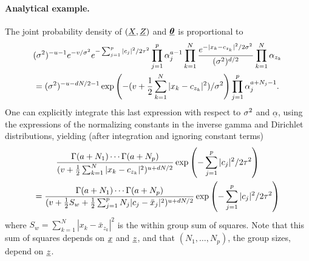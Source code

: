 \paragraph{Analytical example.}
The joint probability density of $({\underline{X}}, {\underline{Z}})$ and $\underline{\bm {\theta}}$ is proportional to
\begin{multline*}
(\sigma^2)^{-u-1} e^{-v/\sigma^2} e^{-\sum_{j=1}^p |c_j|^2/2\tau^2} \prod_{j=1}^p \alpha_j^{a-1}\prod_{k=1}^N \frac{e^{-|x_k - c_{z_k}|^2/2\sigma^2}}{(\sigma^2)^{d/2}} \prod_{k=1}^N \alpha_{z_k} \\
= (\sigma^2)^{-u-dN/2 -1} \exp\left(- (v + \frac12 \sum_{k=1}^N|x_k-c_{z_k}|^2)/\sigma^2\right)\prod_{j=1}^p \alpha_j^{a+N_j-1} . 
\end{multline*}
One can explicitly integrate this last expression with respect to $\sigma^2$ and $\underline\alpha$, using the expressions of the normalizing constants in  the inverse gamma and Dirichlet distributions, yielding (after integration and ignoring constant terms)
\begin{multline*}
\frac{\Gamma(a+N_1) \cdots \Gamma(a+N_p)}{(v + \frac12 \sum_{k=1}^N|x_k-c_{z_k}|^2)^{u+dN/2}} \exp\left(- \sum_{j=1}^p |c_j|^2/2\tau^2\right)\\
= \frac{\Gamma(a+N_1) \cdots \Gamma(a+N_p)}{(v + \frac12 S_w + \frac12 \sum_{j=1}^p N_j |c_{j} - \bar x_j|^2)^{u+dN/2}} \exp\left(- \sum_{j=1}^p |c_j|^2/2\tau^2\right)
\end{multline*}
where $S_w = \sum_{k=1}^N |x_k - \bar x_{z_k}|^2$ is the within group sum of squares. Note that this sum of squares depends on ${\underline{x}}$ and ${\underline{z}}$, and that $(N_1, \ldots, N_p)$, the group sizes, depend on ${\underline{z}}$. 

